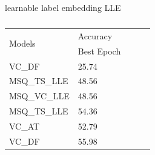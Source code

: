 learnable label embedding
LLE
\begin{table}[ht]
    \centering
    \caption[] {}
    \label{tab:ablation_vc}
    \begin{tabular}{lllll}
        \toprule
        \multirow{2}{*}{Models} & Accuracy \\
        \cmidrule{2-2} 
        {} &  Best Epoch \\
        \midrule
        VC\_DF & 25.74 \\
        MSQ_TS_LLE   & 48.56 \\
        MSQ_VC_LLE   & 48.56 \\
        MSQ_TS_LLE         & 54.36 \\
        VC\_AT     & 52.79 \\
        VC\_DF     & 55.98 \\
        \bottomrule
    \end{tabular}
\end{table}



